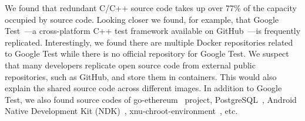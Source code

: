 We found that redundant C/C++ source code takes up over 77\% of the capacity
occupied by source code.
%
Looking closer we found, for example, that Google Test~\cite{googletest}---a
cross-platform C++ test framework available on GitHub~\cite{github}---is
frequently replicated.
%
%
Interestingly, we found there are multiple Docker repositories  related to Google Test while there is no official
repository for Google Test.
%
We suspect that many developers replicate open source code from external public
repositories, such as GitHub, and store them in containers.
%
This would also explain the shared source code across different images.
%
% 
In addition to Google Test, we also found source codes of go-ethereum~\cite{go-ethereum} project, PostgreSQL~\cite{PostgreSQL}, Android Native Development Kit (NDK)~\cite{NDK}, xnu-chroot-environment~\cite{xnu-chroot-environment}, etc. 
%
%
%

